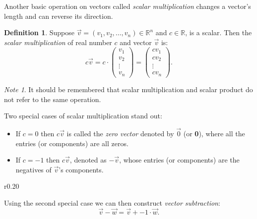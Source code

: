 \documentclass[11pt]{amsart} %
\theoremstyle{plain}
\theoremstyle{definition}
\newtheorem*{dfn}{Definition}
\theoremstyle{definition}
\theoremstyle{remark}
\newtheorem*{note}{Note}
\theoremstyle{definition}
\begin{document}
Another basic operation on vectors called \emph{scalar multiplication} changes a vector's length and can reverse its direction.

\begin{tcolorbox}[colback=yellow!5!white]
\begin{dfn}
      Suppose $\vec{v} = (v_1, v_2,\dots,v_n) \in\mathbb{R}^{n}$ and $c\in\mathbb{R}$, is a scalar. Then the \emph{scalar multiplication} of real number $c$ and vector $\vec{v}$ is:
      \[ c\vec{v}= c \cdot \left( \begin{smallmatrix} v_1 \\ v_2 \\ \vdots \\ v_n \end{smallmatrix} \right) = \left( \begin{smallmatrix} cv_1 \\ cv_2 \\ \vdots \\ cv_n \end{smallmatrix}  \right).  \]
\end{dfn}
\end{tcolorbox}

\begin{note}
      It should be remembered that scalar multiplication and scalar product do not refer to the same operation.
\end{note}

Two special cases of scalar multiplication stand out:
\begin{itemize}
      \item If $c=0$ then $c\vec{v}$ is called the \emph{zero vector} denoted by $\vec{0}$ (or \textbf{0}), where all the entries (or components) are all zeros.
      \item If $c=-1$ then $c\vec{v}$, denoted as $-\vec{v}$, whose entries (or components) are the negatives of $\vec{v}$'s components.
\end{itemize}


\begin{wrapfigure}{r}{0.20\textwidth}
\end{wrapfigure}
Using the second special case we can then construct \emph{vector subtraction}:
\[ \vec{v}-\vec{w} = \vec{v} + -1\cdot\vec{w}.  \]
\end{document}
